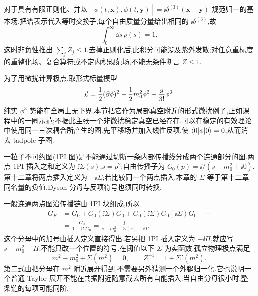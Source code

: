 对于具有有限正则化、并以 $[\phi(t,\boldsymbol x),\dot\phi(t,\boldsymbol y)]=\ii\delta^{(3)}(\boldsymbol x-\boldsymbol y)$ 规范归一的基本场,把谱表示代入等时交换子,每个自由质量分量给出相同的 $\ii\delta^{(3)}$,故
\[
 \int_0^\infty\dd s\,\rho(s)=1.
\]
这时非负性推出 $\sum_jZ_j\leq1$.去掉正则化后,此积分可能涉及紫外发散;对任意重标度的重整化场、复合算符或不定内积规范场,不能无条件断言 $Z\leq1$.

为了用微扰计算极点,取形式标量模型
\[
 \mathcal L=\frac12(\partial\phi)^2-\frac12m_0^2\phi^2-\frac g{3!}\phi^3.
\]
纯实 $\phi^3$ 势能在全局上无下界,本节把它作为局部真空附近的形式微扰例子,正如课程中的一圈示范;不据此主张一个非微扰稳定真空已经存在.可以在稳定的有效理论中使用同一三次耦合所产生的图.先平移场并加入线性反项,使 $\langle 0\rvert\phi\lvert 0\rangle=0$,从而消去 tadpole 子图.

\begin{definition}[自能与本章符号]
一粒子不可约图(1PI 图)是不能通过切断一条内部传播线分成两个连通部分的图.两点 1PI 插入之和定义为 $\ii\Sigma(s)$,$s=p^2$;自由传播子为 $G_0(p)=\ii/(s-m_0^2+\ii0)$.第十二章将两点插入定义为 $-\ii\Sigma$;若比较同一个两点插入,本章的 $\Sigma$ 等于第十二章同名量的负值,Dyson 分母与反项符号也须同时转换.
\end{definition}

一般连通两点图沿传播链由 1PI 块组成,所以
\begin{align*}
 G_F&=G_0+G_0(\ii\Sigma)G_0+G_0(\ii\Sigma)G_0(\ii\Sigma)G_0+\cdots\\
 &=\frac{G_0}{1-\ii\Sigma G_0}
 =\frac{\ii}{s-m_0^2+\Sigma(s)+\ii0}.
\end{align*}
这个分母中的加号由插入定义直接得出.若另把 1PI 插入定义为 $-\ii\Pi$,就应写 $s-m_0^2-\Pi$;不能只改一个位置的符号.在阈值以下 $\Sigma$ 为实函数.孤立物理极点满足
\begin{equation}\label{eq:pole-mass-Z}
 m^2-m_0^2+\Sigma(m^2)=0,\qquad
 Z^{-1}=1+\Sigma'(m^2).
\end{equation}
第二式由把分母在 $m^2$ 附近展开得到,不需要另外猜测一个外腿归一化.它也说明一个普通 Taylor 展开不能在共振附近随意截去所有自能插入:当自由分母很小时,整条链的每项可能同阶.

